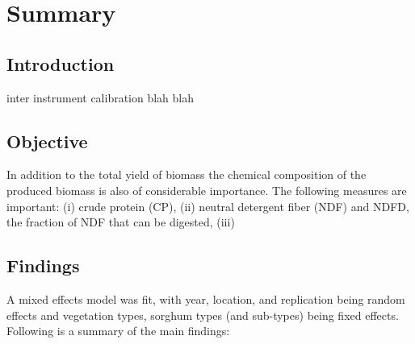\section*{Summary} \label{Sec_Summary}
\subsection*{Introduction}
inter instrument calibration
blah
blah


\subsection*{Objective}
In addition to the total yield of biomass the chemical composition of the produced biomass is also of considerable importance. The following measures are important: (i) crude protein (CP), (ii) neutral
detergent fiber (NDF) and NDFD, the fraction of NDF that can be digested, (iii) 

\subsection*{Findings}
A mixed effects model was fit, with year, location, and replication being random effects and vegetation types, sorghum types (and sub-types) being fixed effects. Following is a summary of the main findings:

